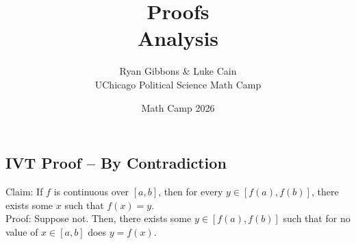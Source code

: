 \documentclass[11pt]{article}
\title{Proofs \\[0.35em] \large Analysis}
\author{Ryan Gibbons \& Luke Cain \\ UChicago Political Science Math Camp}
\date{Math Camp 2026}
\theoremstyle{plain}
\theoremstyle{definition}
\theoremstyle{remark}
\begin{document}
\maketitle


\subsection*{IVT Proof -- By Contradiction}

Claim: If $f$ is continuous over $[a,b]$, then for every $y \in [f(a),f(b)]$, there exists some $x$ such that $f(x) = y$. \\

Proof: Suppose not. Then, there exists some $y \in [f(a),f(b)]$ such that for no value of $x \in [a,b]$ does $y = f(x)$.
\end{document}
